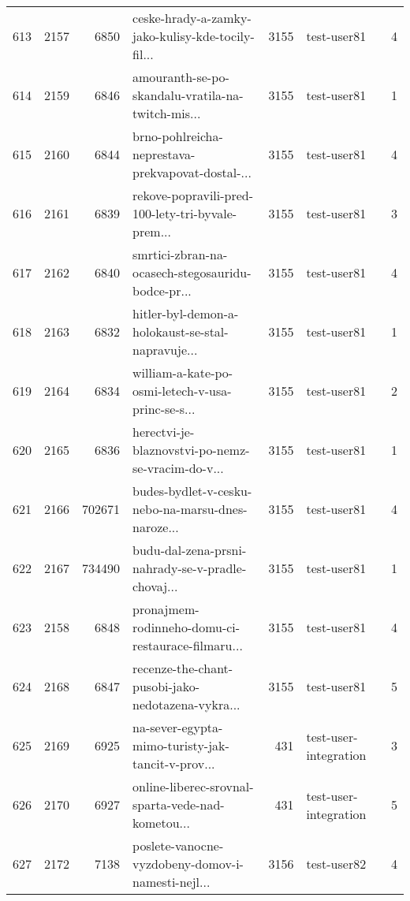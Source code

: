 \begin{tabular}{lrrlrlr}
613  &       2157 &     6850 &  ceske-hrady-a-zamky-jako-kulisy-kde-tocily-fil... &     3155 &                  test-user81 &               4 \\
614  &       2159 &     6846 &  amouranth-se-po-skandalu-vratila-na-twitch-mis... &     3155 &                  test-user81 &               1 \\
615  &       2160 &     6844 &  brno-pohlreicha-neprestava-prekvapovat-dostal-... &     3155 &                  test-user81 &               4 \\
616  &       2161 &     6839 &  rekove-popravili-pred-100-lety-tri-byvale-prem... &     3155 &                  test-user81 &               3 \\
617  &       2162 &     6840 &  smrtici-zbran-na-ocasech-stegosauridu-bodce-pr... &     3155 &                  test-user81 &               4 \\
618  &       2163 &     6832 &  hitler-byl-demon-a-holokaust-se-stal-napravuje... &     3155 &                  test-user81 &               1 \\
619  &       2164 &     6834 &  william-a-kate-po-osmi-letech-v-usa-princ-se-s... &     3155 &                  test-user81 &               2 \\
620  &       2165 &     6836 &  herectvi-je-blaznovstvi-po-nemz-se-vracim-do-v... &     3155 &                  test-user81 &               1 \\
621  &       2166 &   702671 &  budes-bydlet-v-cesku-nebo-na-marsu-dnes-naroze... &     3155 &                  test-user81 &               4 \\
622  &       2167 &   734490 &  budu-dal-zena-prsni-nahrady-se-v-pradle-chovaj... &     3155 &                  test-user81 &               1 \\
623  &       2158 &     6848 &  pronajmem-rodinneho-domu-ci-restaurace-filmaru... &     3155 &                  test-user81 &               4 \\
624  &       2168 &     6847 &  recenze-the-chant-pusobi-jako-nedotazena-vykra... &     3155 &                  test-user81 &               5 \\
625  &       2169 &     6925 &  na-sever-egypta-mimo-turisty-jak-tancit-v-prov... &      431 &        test-user-integration &               3 \\
626  &       2170 &     6927 &  online-liberec-srovnal-sparta-vede-nad-kometou... &      431 &        test-user-integration &               5 \\
627  &       2172 &     7138 &  poslete-vanocne-vyzdobeny-domov-i-namesti-nejl... &     3156 &                  test-user82 &               4 \\

\end{tabular}
